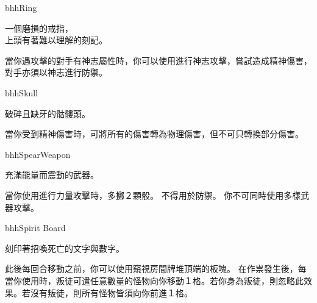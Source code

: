 \linebreak[0]%
\begin{OmenCard}{bhh}{Ring}{}
  \begin{CardStory}
    一個磨損的戒指，\\
    上頭有著難以理解的刻記。
  \end{CardStory}
  當你遇攻擊的對手有神志屬性時，你可以使用\ThisName{}進行神志攻擊，嘗試造成精神傷害，對手亦須以神志進行防禦。\smallbreak
\end{OmenCard}%
\linebreak[0]%
\begin{OmenCard}{bhh}{Skull}{}
  \begin{CardStory}
    破碎且缺牙的骷髏頭。
  \end{CardStory}
  當你受到精神傷害時，可將所有的傷害轉為物理傷害，但不可只轉換部分傷害。\smallbreak
\end{OmenCard}%
\linebreak[0]%
\begin{OmenCard}{bhh}{Spear}{Weapon}
  \begin{CardStory}
    充滿能量而震動的武器。
  \end{CardStory}
  當你使用\ThisName{}進行力量攻擊時，多擲２顆骰。\smallbreak
  \ThisName{}不得用於防禦。\smallbreak
  你不可同時使用多樣武器攻擊。\smallbreak
\end{OmenCard}%
\linebreak[0]%
\begin{OmenCard}{bhh}{Spirit Board}{}
  \begin{CardStory}
    刻印著招喚死亡的文字與數字。
  \end{CardStory}
  此後每回合移動之前，你可以使用\ThisName{}窺視房間牌堆頂端的板塊。\smallbreak
  在作祟發生後，每當你使用\ThisName{}時，叛徒可遣任意數量的怪物向你移動１格。若你身為叛徒，則忽略此效果。若沒有叛徒，則所有怪物皆須向你前進１格。\smallbreak
\end{OmenCard}%
\linebreak[0]%
